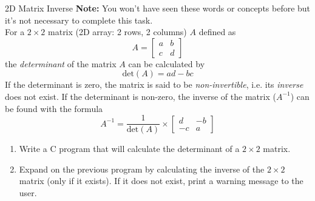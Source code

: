 \documentclass{pass}
\begin{document}
\begin{task}{2D Matrix Inverse}{}
\textbf{Note:} You won't have seen these words or concepts before but it's not necessary to complete this task.\\

For a $2\times2$ matrix (2D array: 2 rows, 2 columns) $A$ defined as
$$ A = \begin{bmatrix} a & b \\ c & d \end{bmatrix} $$
the \textit{determinant} of the matrix $A$ can be calculated by
$$ \text{det}(A) = ad-bc $$
If the determinant is zero, the matrix is said to be \textit{non-invertible}, i.e. its \textit{inverse} does not exist. If the determinant is non-zero, the inverse of the matrix ($A^{-1}$) can be found with the formula
$$ A^{-1} = \dfrac{1}{\text{det}(A)} \times \begin{bmatrix} d & -b \\ -c & a \end{bmatrix} $$
	\begin{enumerate}
	\item Write a C program that will calculate the determinant of a $2\times2$ matrix.\\
	\item Expand on the previous program by calculating the inverse of the $2\times2$ matrix (only if it exists). If it does not exist, print a warning message to the user.
	\end{enumerate}


\end{task}
\end{document}
